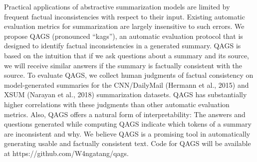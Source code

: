 Practical applications of abstractive summarization models are limited by frequent factual inconsistencies with respect to their input. Existing automatic evaluation metrics for summarization are largely insensitive to such errors. We propose QAGS (pronounced ``kags''), an automatic evaluation protocol that is designed to identify factual inconsistencies in a generated summary. QAGS is based on the intuition that if we ask questions about a summary and its source, we will receive similar answers if the summary is factually consistent with the source. To evaluate QAGS, we collect human judgments of factual consistency on model-generated summaries for the CNN/DailyMail (Hermann et al., 2015) and XSUM (Narayan et al., 2018) summarization datasets. QAGS has substantially higher correlations with these judgments than other automatic evaluation metrics. Also, QAGS offers a natural form of interpretability: The answers and questions generated while computing QAGS indicate which tokens of a summary are inconsistent and why. We believe QAGS is a promising tool in automatically generating usable and factually consistent text. Code for QAGS will be available at https://github.com/W4ngatang/qags.
